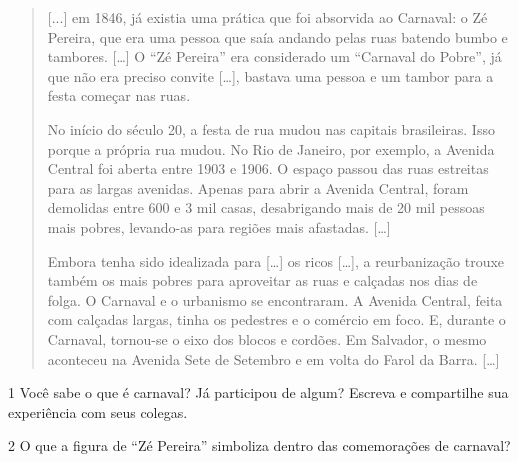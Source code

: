 \begin{quote}
{[}...{]} em 1846, já existia uma prática que foi absorvida ao Carnaval: o Zé
Pereira, que era uma pessoa que saía andando pelas ruas batendo bumbo e
tambores. {[}\ldots{}{]} O “Zé
Pereira” era considerado um “Carnaval do Pobre”, já que não era
preciso convite {[}\ldots{}{]}, bastava uma pessoa e um tambor
para a festa começar nas ruas.

No início do século 20, a festa de rua mudou nas capitais brasileiras.
Isso porque a própria rua mudou. No Rio de Janeiro, por exemplo, a
Avenida Central foi aberta entre 1903 e 1906. O espaço passou das ruas
estreitas para as largas avenidas. Apenas para abrir a Avenida Central,
foram demolidas entre 600 e 3 mil casas, desabrigando mais de 20 mil
pessoas mais pobres, levando-as para regiões mais afastadas. {[}\ldots{}{]}

Embora tenha sido idealizada para {[}\ldots{}{]} os ricos {[}\ldots{}{]}, a reurbanização trouxe também os mais pobres para aproveitar
as ruas e calçadas nos dias de folga. O Carnaval e o urbanismo se
encontraram. A Avenida Central, feita com calçadas largas, tinha os
pedestres e o comércio em foco. E, durante o Carnaval, tornou-se o eixo
dos blocos e cordões. Em Salvador, o mesmo aconteceu na Avenida Sete de
Setembro e em volta do Farol da Barra. {[}\ldots{}{]}

\end{quote}

\num{1} Você sabe o que é carnaval? Já participou de algum? Escreva e
compartilhe sua experiência com seus colegas.


\num{2} O que a figura de “Zé Pereira” simboliza dentro das comemorações de
carnaval?



